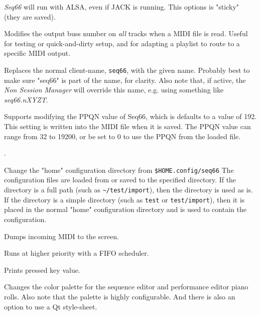       \textsl{Seq66} will run with ALSA, even if JACK is running.
      This options is "sticky" (they are saved).

      Modifies the output buss number on \textsl{all} tracks when a MIDI file is
      read. Useful for testing or quick-and-dirty setup, and for adapting a
      playlist to route to a specific MIDI output.

      Replaces the normal client-name, \texttt{seq66}, with the given name.
      Probably best to make sure "seq66" is part of the name, for clarity.
      Also note that, if active, the \textsl{Non Session Manager} will override
      this name, e.g. using something like \textsl{seq66.nXYZT}.

      Supports modifying the PPQN value of Seq66, which is
      defaults to a value of 192.  This setting
      is written into the MIDI file when it is saved.
      The PPQN value can range from 32 to 19200, or
      be set to 0 to use the PPQN from the loaded file.

      .


      Change the "home" configuration directory from \texttt{\$HOME.config/seq66}
      The configuration files are loaded from or saved to the specified directory.
      If the directory is a full path (such as 
      \texttt{\textasciitilde/test/import}), then
      the directory is used as is.
      If the directory is a simple directory (such as \texttt{test}
      or \texttt{test/import}), then it
      is placed in the normal "home" configuration directory and is used
      to contain the configuration.

      Dumps incoming MIDI to the screen.

      Runs at higher priority with a FIFO scheduler.


      Prints pressed key value.

      Changes the color palette for the sequence editor and performance editor
      piano rolls.  Also note that the palette is highly configurable.
      And there is also an option to use a Qt style-sheet.

